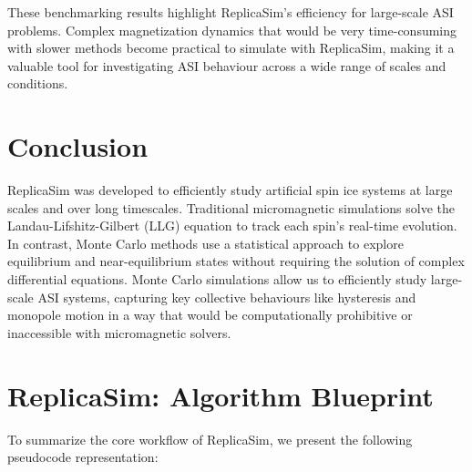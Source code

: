 \documentclass[journal=nalefd,manuscript=letter]{achemso}
\begin{document}
These benchmarking results highlight ReplicaSim’s efficiency for large-scale ASI problems. Complex magnetization dynamics that would be very time-consuming with slower methods become practical to simulate with ReplicaSim, making it a valuable tool for investigating ASI behaviour across a wide range of scales and conditions.

\section{Conclusion}
ReplicaSim was developed to efficiently study artificial spin ice systems at large scales and over long timescales. Traditional micromagnetic simulations solve the Landau-Lifshitz-Gilbert (LLG) equation to track each spin’s real-time evolution. In contrast, Monte Carlo methods use a statistical approach to explore equilibrium and near-equilibrium states without requiring the solution of complex differential equations. Monte Carlo simulations allow us to efficiently study large-scale ASI systems, capturing key collective behaviours like hysteresis and monopole motion in a way that would be computationally prohibitive or inaccessible with micromagnetic solvers.

\section{ReplicaSim: Algorithm Blueprint}

To summarize the core workflow of ReplicaSim, we present the following pseudocode representation:
\end{document}
